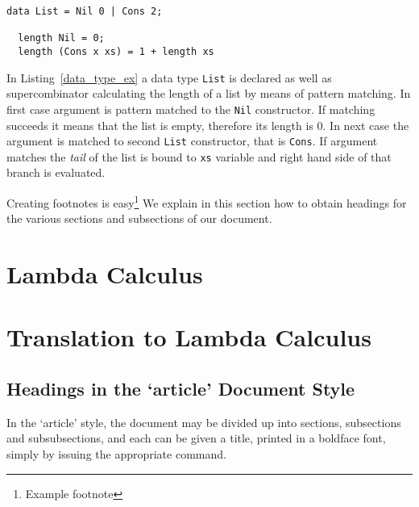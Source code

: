 \documentclass[a4paper]{report}
\begin{document}
\begin{lstlisting}[label=data_type_ex,caption={Calculating length of list.}]
  data List = Nil 0 | Cons 2;

  length Nil = 0;
  length (Cons x xs) = 1 + length xs
\end{lstlisting}

In Listing~\ref{data_type_ex} a data type \texttt{List} is declared as well as
supercombinator calculating the length of a list by means of pattern matching.
In first case argument is pattern matched to the \texttt{Nil} constructor. If
matching succeeds it means that the list is empty, therefore its length is 0.
In next case the argument is matched to second \texttt{List} constructor, that
is \texttt{Cons}. If argument matches the \textit{tail} of the list is bound to
\texttt{xs} variable and right hand side of that branch is evaluated.

Creating footnotes is easy\footnote{Example footnote}
We explain in this section how to obtain headings
for the various sections and subsections of our
document.

\section{Lambda Calculus}

\section{Translation to Lambda Calculus}



\subsection{Headings in the `article' Document Style}

In the `article' style, the document may be divided up
into sections, subsections and subsubsections, and each
can be given a title, printed in a boldface font, simply by issuing the
appropriate command.



\end{document}

